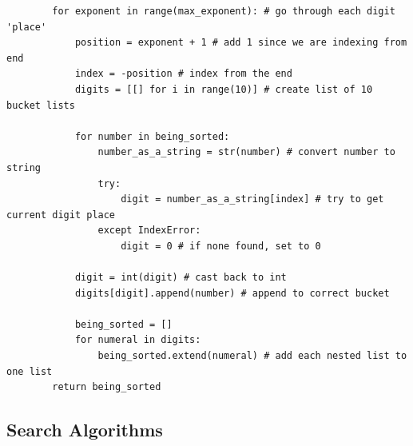 \documentclass[11pt, a4paper]{article}
\begin{document}
\begin{spacing}{1.1}
\begin{lstlisting}
		for exponent in range(max_exponent): # go through each digit 'place'
			position = exponent + 1 # add 1 since we are indexing from end
			index = -position # index from the end 
			digits = [[] for i in range(10)] # create list of 10 bucket lists
			
			for number in being_sorted: 
				number_as_a_string = str(number) # convert number to string
				try:
					digit = number_as_a_string[index] # try to get current digit place
				except IndexError:
					digit = 0 # if none found, set to 0
			
			digit = int(digit) # cast back to int
			digits[digit].append(number) # append to correct bucket
			
			being_sorted = []
			for numeral in digits:
				being_sorted.extend(numeral) # add each nested list to one list	
		return being_sorted	\end{lstlisting} \newpage 
	\subsection{Search Algorithms}

\end{spacing}
\end{document}
